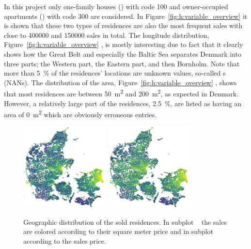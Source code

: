 In this project only one-family houses () with code \num{100} and owner-occupied apartments () with code \num{300} are considered. In Figure~\ref{fig:h:variable_overview}  it is shown that these two types of residences are also the most frequent sales with close to \num{400000} and \num{150000} sales in total. The longitude distribution, Figure~\ref{fig:h:variable_overview} , is mostly interesting due to fact that it clearly shows how the Great Belt and especially the Baltic Sea separates Denmark into three parts; the Western part, the Eastern part, and then Bornholm. Note that more than \SI{5}{\percent} of the residences' locations are unknown values, so-called s (NANs). The distribution of the area, Figure~\ref{fig:h:variable_overview} , shows that most residences are between \SI{50}{\meter^2} and \SI{200}{\meter^2}, as expected in Denmark. However, a relatively large part of the residences, \SI{2.5}{\percent}, are listed as having an area of \SI{0}{\meter^2} which are obviously erroneous entries.

\begin{figure}
  \centering
  \subfloat[\label{fig:h:geo_overview_sqm_price}]{\,}
  \includegraphics[draft=false, width=0.4\textwidth]{figures/housing/Denmark_Overview_SqmPrice.png}\hfil
  \subfloat[\label{fig:h:geo_overview_sales_price}]{\,}
  \includegraphics[draft=false, width=0.4\textwidth]{figures/housing/Denmark_Overview_SalesPrice.png}
  \caption[Geographic Distribution of the Sold Residences]{Geographic distribution of the sold residences. 
           In subplot ~\protect{} the sales are colored according to their square meter price and in subplot ~\protect{} according to the sales price. 
           }
  \label{fig:h:geo_overview}
\end{figure}

